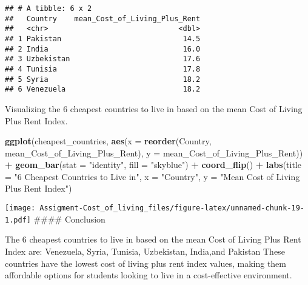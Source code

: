 \documentclass[
]{article}
\newenvironment{Shaded}{\begin{snugshade}}{\end{snugshade}}
\newcommand{\AttributeTok}[1]{\textcolor[rgb]{0.13,0.29,0.53}{#1}}
\newcommand{\FunctionTok}[1]{\textcolor[rgb]{0.13,0.29,0.53}{\textbf{#1}}}
\newcommand{\NormalTok}[1]{#1}
\newcommand{\SpecialCharTok}[1]{\textcolor[rgb]{0.81,0.36,0.00}{\textbf{#1}}}
\newcommand{\StringTok}[1]{\textcolor[rgb]{0.31,0.60,0.02}{#1}}
\begin{document}
\begin{verbatim}
## # A tibble: 6 x 2
##   Country    mean_Cost_of_Living_Plus_Rent
##   <chr>                              <dbl>
## 1 Pakistan                            14.5
## 2 India                               16.0
## 3 Uzbekistan                          17.6
## 4 Tunisia                             17.8
## 5 Syria                               18.2
## 6 Venezuela                           18.2
\end{verbatim}

Visualizing the 6 cheapest countries to live in based on the mean Cost
of Living Plus Rent Index.

\begin{Shaded}
\begin{Highlighting}[]
\FunctionTok{ggplot}\NormalTok{(cheapest\_countries, }\FunctionTok{aes}\NormalTok{(}\AttributeTok{x =} \FunctionTok{reorder}\NormalTok{(Country, mean\_Cost\_of\_Living\_Plus\_Rent), }\AttributeTok{y =}\NormalTok{ mean\_Cost\_of\_Living\_Plus\_Rent)) }\SpecialCharTok{+}
  \FunctionTok{geom\_bar}\NormalTok{(}\AttributeTok{stat =} \StringTok{"identity"}\NormalTok{, }\AttributeTok{fill =} \StringTok{"skyblue"}\NormalTok{) }\SpecialCharTok{+}
  \FunctionTok{coord\_flip}\NormalTok{() }\SpecialCharTok{+}
  \FunctionTok{labs}\NormalTok{(}\AttributeTok{title =} \StringTok{"6 Cheapest Countries to Live in"}\NormalTok{,}
       \AttributeTok{x =} \StringTok{"Country"}\NormalTok{,}
       \AttributeTok{y =} \StringTok{"Mean Cost of Living Plus Rent Index"}\NormalTok{)}
\end{Highlighting}
\end{Shaded}

\texttt{[image: Assigment-Cost\_of\_living\_files/figure-latex/unnamed-chunk-19-1.pdf]}
\#\#\#\# Conclusion

The 6 cheapest countries to live in based on the mean Cost of Living
Plus Rent Index are: Venezuela, Syria, Tunisia, Uzbekistan, India,and
Pakistan These countries have the lowest cost of living plus rent index
values, making them affordable options for students looking to live in a
cost-effective environment.
\end{document}
